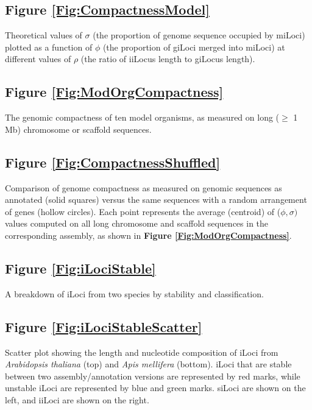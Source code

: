 \subsection*{Figure \ref{Fig:CompactnessModel}}

\noindent
Theoretical values of $\sigma$ (the proportion of genome sequence occupied by miLoci) plotted as a function of $\phi$ (the proportion of giLoci merged into miLoci) at different values of $\rho$ (the ratio of iiLocus length to giLocus length).

\subsection*{Figure \ref{Fig:ModOrgCompactness}}

\noindent
The genomic compactness of ten model organisms, as measured on long ($\geq$ 1 Mb) chromosome or scaffold sequences.

\subsection*{Figure \ref{Fig:CompactnessShuffled}}

\noindent
Comparison of genome compactness as measured on genomic sequences as annotated (solid squares) versus the same sequences with a random arrangement of genes (hollow circles). Each point represents the average (centroid) of ($\phi, \sigma)$ values computed on all long chromosome and scaffold sequences in the corresponding assembly, as shown in \textbf{Figure \ref{Fig:ModOrgCompactness}}.

\subsection*{Figure \ref{Fig:iLociStable}}

\noindent
A breakdown of iLoci from two species by stability and classification.

\subsection*{Figure \ref{Fig:iLociStableScatter}}

\noindent
Scatter plot showing the length and nucleotide composition of iLoci from \textit{Arabidopsis thaliana} (top) and \textit{Apis mellifera} (bottom). iLoci that are stable between two assembly/annotation versions are represented by red marks, while unstable iLoci are represented by blue and green marks. siLoci are shown on the left, and iiLoci are shown on the right.

